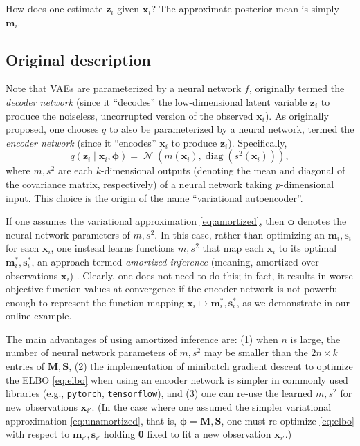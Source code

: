 \documentclass[reqno,11pt]{amsart}
\DeclareMathOperator\diag{diag}
\DeclareMathOperator\N{\mathcal{N}}
\newcommand\mm{\mathbf{M}}
\newcommand\ms{\mathbf{S}}
\newcommand\vm{\mathbf{m}}
\newcommand\vphi{\boldsymbol{\phi}}
\newcommand\vs{\mathbf{s}}
\newcommand\vtheta{\boldsymbol{\theta}}
\newcommand\vx{\mathbf{x}}
\newcommand\vz{\mathbf{z}}
\begin{document}
How does one estimate $\vz_i$ given $\vx_i$? The approximate posterior mean is
simply $\vm_i$.

\subsection{Original description}

Note that VAEs are parameterized by a neural network $f$, originally termed the
\emph{decoder network} (since it ``decodes'' the low-dimensional latent
variable $\vz_i$ to produce the noiseless, uncorrupted version of the observed
$\vx_i$). As originally proposed, one chooses $q$ to also be parameterized by a
neural network, termed the \emph{encoder network} (since it ``encodes'' $\vx_i$
to produce $\vz_i$). Specifically,
%
\begin{equation}
  q(\vz_i \mid \vx_i, \vphi) = \N(m(\vx_i), \diag(s^2(\vx_i))),
  \label{eq:amortized}
\end{equation}
%
where $m, s^2$ are each $k$-dimensional outputs (denoting the mean and diagonal
of the covariance matrix, respectively) of a neural network taking
$p$-dimensional input. This choice is the origin of the name ``variational
autoencoder''.

If one assumes the variational approximation \eqref{eq:amortized}, then $\vphi$
denotes the neural network parameters of $m, s^2$. In this case, rather than
optimizing an $\vm_i, \vs_i$ for each $\vx_i$, one instead learns functions $m,
s^2$ that map each $\vx_i$ to its optimal $\vm_i^*, \vs_i^*$, an approach
termed \emph{amortized inference} (meaning, amortized over observations
$\vx_i$) \cite{Gershman2014}. Clearly, one does not need to do this; in fact,
it results in worse objective function values at convergence if the encoder
network is not powerful enough to represent the function mapping $\vx_i \mapsto
\vm_i^*, \vs_i^*$, as we demonstrate in our online example.

The main advantages of using amortized inference are: (1) when $n$ is large,
the number of neural network parameters of $m, s^2$ may be smaller than the $2n
\times k$ entries of $\mm, \ms$, (2) the implementation of minibatch gradient
descent to optimize the ELBO \eqref{eq:elbo} when using an encoder network is
simpler in commonly used libraries (e.g., \texttt{pytorch},
\texttt{tensorflow}), and (3) one can re-use the learned $m, s^2$ for new
observations $\vx_{i'}$. (In the case where one assumed the simpler variational
approximation \eqref{eq:unamortized}, that is, $\vphi = \mm, \ms$, one must
re-optimize \eqref{eq:elbo} with respect to $\vm_{i'}, \vs_{i'}$ holding
$\vtheta$ fixed to fit a new observation $\vx_{i'}$.)

\printbibliography
\end{document}
